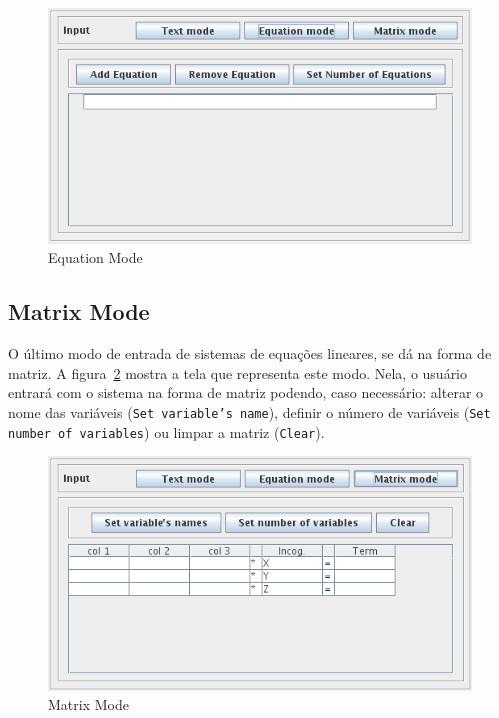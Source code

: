 \documentclass[a4paper,10pt]{report}
\begin{document}
\begin{figure}[ht]
 \centering
 \includegraphics[scale=0.8, bb=0 0 355 197]{screen-3-eq.png}
 \caption{Equation Mode}
 \label{fig:eq}
\end{figure}

\subsection{Matrix Mode}

O último modo de entrada de sistemas de equações lineares, se dá na forma de matriz. A figura~\ref{fig:matrix} mostra a tela que representa este modo. Nela, o usuário entrará com o sistema na forma de matriz podendo, caso necessário: alterar o nome das variáveis (\texttt{Set variable's name}), definir o número de variáveis (\texttt{Set number of variables}) ou limpar a matriz (\texttt{Clear}).

\begin{figure}[ht]
 \centering
 \includegraphics[scale=0.8, bb=0 0 354 196]{screen-4-matrix.png}
 \caption{Matrix Mode}
 \label{fig:matrix}
\end{figure}
\end{document}
